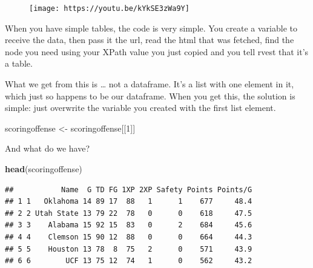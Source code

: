 \documentclass[]{book}
\newenvironment{Shaded}{\begin{snugshade}}{\end{snugshade}}
\newcommand{\KeywordTok}[1]{\textcolor[rgb]{0.13,0.29,0.53}{\textbf{#1}}}
\newcommand{\DataTypeTok}[1]{\textcolor[rgb]{0.13,0.29,0.53}{#1}}
\newcommand{\DecValTok}[1]{\textcolor[rgb]{0.00,0.00,0.81}{#1}}
\newcommand{\StringTok}[1]{\textcolor[rgb]{0.31,0.60,0.02}{#1}}
\newcommand{\OperatorTok}[1]{\textcolor[rgb]{0.81,0.36,0.00}{\textbf{#1}}}
\newcommand{\NormalTok}[1]{#1}
\begin{document}
\begin{figure}
\centering
\texttt{[image: https://youtu.be/kYkSE3zWa9Y]}
\caption{}
\end{figure}

When you have simple tables, the code is very simple. You create a
variable to receive the data, then pass it the url, read the html that
was fetched, find the node you need using your XPath value you just
copied and you tell rvest that it's a table.

\begin{Shaded}
\end{Shaded}

What we get from this is \ldots{} not a dataframe. It's a list with one
element in it, which just so happens to be our dataframe. When you get
this, the solution is simple: just overwrite the variable you created
with the first list element.

\begin{Shaded}
\begin{Highlighting}[]
\NormalTok{scoringoffense <-}\StringTok{ }\NormalTok{scoringoffense[[}\DecValTok{1}\NormalTok{]]}
\end{Highlighting}
\end{Shaded}

And what do we have?

\begin{Shaded}
\begin{Highlighting}[]
\KeywordTok{head}\NormalTok{(scoringoffense)}
\end{Highlighting}
\end{Shaded}

\begin{verbatim}
##           Name  G TD FG 1XP 2XP Safety Points Points/G
## 1 1   Oklahoma 14 89 17  88   1      1    677     48.4
## 2 2 Utah State 13 79 22  78   0      0    618     47.5
## 3 3    Alabama 15 92 15  83   0      2    684     45.6
## 4 4    Clemson 15 90 12  88   0      0    664     44.3
## 5 5    Houston 13 78  8  75   2      0    571     43.9
## 6 6        UCF 13 75 12  74   1      0    562     43.2
\end{verbatim}
\end{document}
